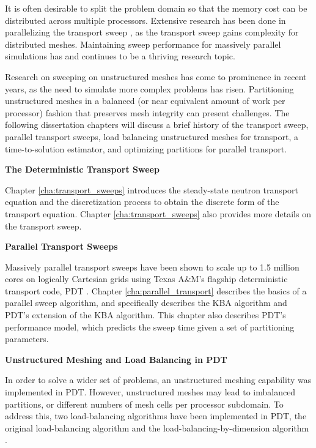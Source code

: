 {It is often desirable to split the problem domain so that the memory cost can be distributed across multiple processors.
Extensive research has been done in parallelizing the transport sweep \cite{KBA,partisn,denovo,mpadams2013,mpadams2015,mpadamsjcp}, as the transport sweep gains complexity for distributed meshes. Maintaining sweep performance for massively parallel simulations has and continues to be a thriving research topic.

Research on sweeping on unstructured meshes has come to prominence in recent years, as the need to simulate more complex problems has risen.
Partitioning unstructured meshes in a balanced (or near equivalent amount of work per processor) fashion that preserves mesh integrity can present challenges.
The following dissertation chapters will discuss a brief history of the transport sweep, parallel transport sweeps, load balancing unstructured meshes for transport, a time-to-solution estimator, and optimizing partitions for parallel transport.

\noindent \textbf{The Deterministic Transport Sweep}

Chapter \ref{cha:transport_sweeps} introduces the steady-state neutron transport equation and the discretization process to obtain the discrete form of the transport equation. Chapter \ref{cha:transport_sweeps} also provides more details on the transport sweep.

\noindent \textbf{Parallel Transport Sweeps}

Massively parallel transport sweeps have been shown to scale up to 1.5 million cores on logically Cartesian grids using Texas A\&M's flagship deterministic transport code, PDT \cite{mpadams2013,mpadams2015,mpadamsjcp}.
Chapter \ref{cha:parallel_transport} describes the basics of a parallel sweep algorithm, and specifically describes the KBA algorithm \cite{KBA} and PDT's extension of the KBA algorithm.
This chapter also describes PDT's performance model, which predicts the sweep time given a set of partitioning parameters.

\noindent \textbf{Unstructured Meshing and Load Balancing in PDT}

In order to solve a wider set of problems, an unstructured meshing capability was implemented in PDT.
However, unstructured meshes may lead to imbalanced partitions, or different numbers of mesh cells per processor subdomain.
To address this, two load-balancing algorithms have been implemented in PDT, the original load-balancing algorithm and the load-balancing-by-dimension algorithm \cite{mastersthesis,mc2017}.

}
